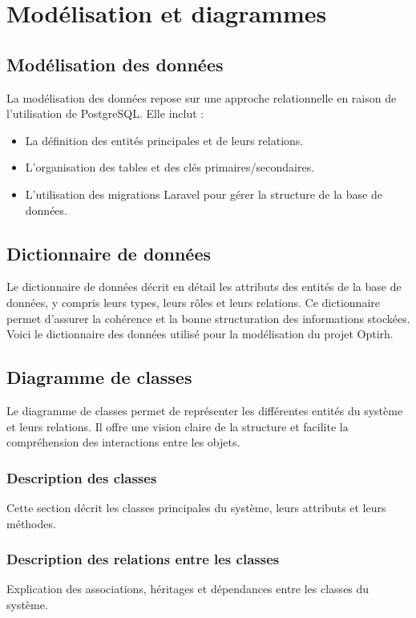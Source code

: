 \section{Modélisation et diagrammes}

\subsection{Modélisation des données}
La modélisation des données repose sur une approche relationnelle en raison de l'utilisation de PostgreSQL. Elle inclut :
\begin{itemize}
    \item La définition des entités principales et de leurs relations.
    \item L'organisation des tables et des clés primaires/secondaires.
    \item L'utilisation des migrations Laravel pour gérer la structure de la base de données.
\end{itemize}

\subsection{Dictionnaire de données}
Le dictionnaire de données décrit en détail les attributs des entités de la base de données, y compris leurs types, leurs rôles et leurs relations. Ce dictionnaire permet d'assurer la cohérence et la bonne structuration des informations stockées. Voici le dictionnaire des données utilisé pour la modélisation du projet Optirh.

\subsection{Diagramme de classes}
Le diagramme de classes permet de représenter les différentes entités du système et leurs relations. Il offre une vision claire de la structure et facilite la compréhension des interactions entre les objets.

\subsubsection{Description des classes}
Cette section décrit les classes principales du système, leurs attributs et leurs méthodes.

\subsubsection{Description des relations entre les classes}
Explication des associations, héritages et dépendances entre les classes du système.

